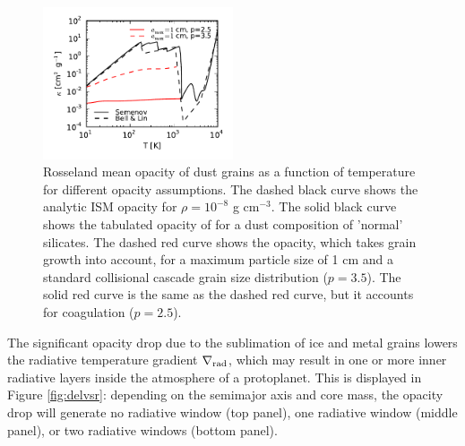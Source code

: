 \documentclass[apj]{emulateapj}
\newcommand{\delrad}{\nabla_{\rm rad}}
\begin{document}
\begin{figure}[h!]
\centering
\includegraphics[width=0.5\textwidth]{../../figs/ModelAtmospheres/RadSelfGravRealEOS/PaperFigs/kappa_grain_growth_SBL_paper.pdf}
\caption{Rosseland mean opacity of dust grains as a function of temperature for different opacity assumptions. The dashed black curve shows the \citet{bell94} analytic ISM opacity for $\rho=10^{-8}$ g cm$^{-3}$. The solid black curve shows the tabulated opacity of \citet{semenov03} for a dust composition of 'normal' silicates. The dashed red curve shows the \citet{dalessio01} opacity, which takes grain growth into account, for a maximum particle size of 1 cm and a standard collisional cascade grain size distribution ($p=3.5$). The solid red curve is the same as the dashed red curve, but it accounts for coagulation ($p=2.5$).}
\label{fig:opacity}
\end{figure}

The significant opacity drop due to the sublimation of ice and metal grains lowers the radiative temperature gradient $\delrad$, which may result in one or more inner radiative layers inside the atmosphere of a protoplanet. This is displayed in Figure \ref{fig:delvsr}: depending on the semimajor axis and core mass, the opacity drop will generate no radiative window (top panel), one radiative window (middle panel), or two radiative windows (bottom panel). 
\end{document}
